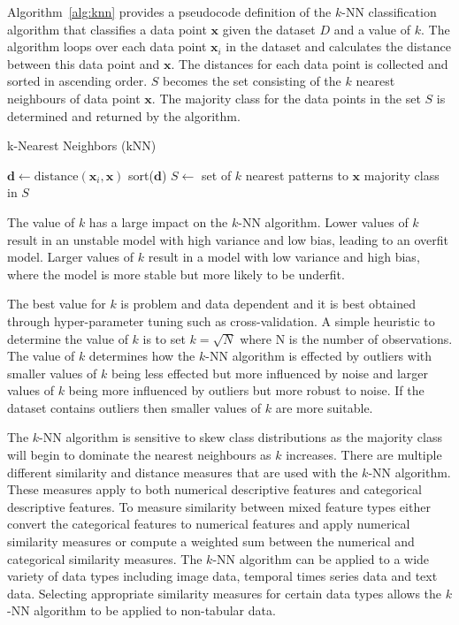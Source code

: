 \documentclass[conference]{IEEEtran}
\begin{document}
	Algorithm~\ref{alg:knn} provides a pseudocode definition of the $k$-NN classification algorithm that classifies a data point $\boldsymbol{x}$ given the dataset $D$ and a value of $k$. The algorithm loops over each data point $\boldsymbol{x}_i$ in the dataset and calculates the distance between this data point and $\boldsymbol{x}$. The distances for each data point is collected and sorted in ascending order. $S$ becomes the set consisting of the $k$ nearest neighbours of data point $\boldsymbol{x}$. The majority class for the data points in the set $S$ is determined and returned by the algorithm.
	\begin{algorithm}[H]
		\caption{k-Nearest Neighbors (kNN)}
		\begin{algorithmic}[1]
			\State $\boldsymbol{d} \gets \text{distance}(\boldsymbol{x}_i, \boldsymbol{x})$
			\EndFor
			\State sort($\boldsymbol{d}$)
			\State $S \gets$ set of $k$ nearest patterns to $\boldsymbol{x}$
			\State \Return majority class in $S$
			\EndFunction
		\end{algorithmic}
		\label{alg:knn}
	\end{algorithm}
	The value of $k$ has a large impact on the $k$-NN algorithm. Lower values of $k$ result in an unstable model with high variance and low bias, leading to an overfit model. Larger values of $k$ result in a model with low variance and high bias, where the model is more stable but more likely to be underfit.
	
	The best value for $k$ is problem and data dependent and it is best obtained through hyper-parameter tuning such as cross-validation. A simple heuristic to determine the value of $k$ is to set $k=\sqrt{N}$ where N is the number of observations. The value of $k$ determines how the $k$-NN algorithm is effected by outliers with smaller values of $k$ being less effected but more influenced by noise and larger values of $k$ being more influenced by outliers but more robust to noise. If the dataset contains outliers then smaller values of $k$ are more suitable. 
	
	The $k$-NN algorithm is sensitive to skew class distributions as the majority class will begin to dominate the nearest neighbours as $k$ increases. There are multiple different similarity and distance measures that are used with the $k$-NN algorithm. These measures apply to both numerical descriptive features and categorical descriptive features. To measure similarity between mixed feature types either convert the categorical features to numerical features and apply numerical similarity measures or compute a weighted sum between the numerical and categorical similarity measures. The $k$-NN algorithm can be applied to a wide variety of data types including image data, temporal times series data and text data. Selecting appropriate similarity measures for certain data types allows the $k$-NN algorithm to be applied to non-tabular data.
\end{document}
